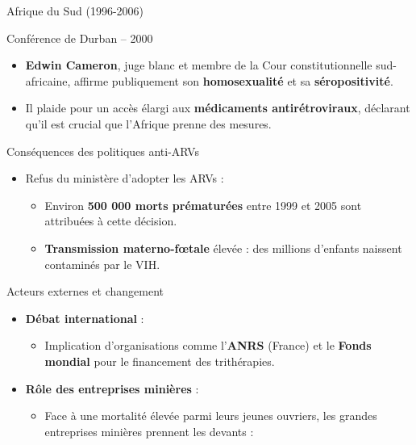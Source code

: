 \documentclass[
  ignorenonframetext,
]{beamer}
\providecommand{\tightlist}{%
  \setlength{\itemsep}{0pt}\setlength{\parskip}{0pt}}\usepackage{longtable,booktabs,array}
\begin{document}
\begin{frame}{Afrique du Sud (1996-2006)}
\begin{block}{Conférence de Durban -- 2000}
\begin{itemize}
  \begin{itemize}
  \tightlist
  \item
    \textbf{Edwin Cameron}, juge blanc et membre de la Cour
    constitutionnelle sud-africaine, affirme publiquement son
    \textbf{homosexualité} et sa \textbf{séropositivité}.
  \item
    Il plaide pour un accès élargi aux \textbf{médicaments
    antirétroviraux}, déclarant qu'il est crucial que l'Afrique prenne
    des mesures.
  \end{itemize}
\end{itemize}
\end{block}

\begin{block}{Conséquences des politiques anti-ARVs}
\protect\hypertarget{consuxe9quences-des-politiques-anti-arvs}{}
\begin{itemize}
\tightlist
\item
  Refus du ministère d'adopter les ARVs :

  \begin{itemize}
  \tightlist
  \item
    Environ \textbf{500 000 morts prématurées} entre 1999 et 2005 sont
    attribuées à cette décision.
  \item
    \textbf{Transmission materno-fœtale} élevée : des millions d'enfants
    naissent contaminés par le VIH.
  \end{itemize}
\end{itemize}
\end{block}

\begin{block}{Acteurs externes et changement}
\protect\hypertarget{acteurs-externes-et-changement}{}
\begin{itemize}
\tightlist
\item
  \textbf{Débat international} :

  \begin{itemize}
  \tightlist
  \item
    Implication d'organisations comme l'\textbf{ANRS} (France) et le
    \textbf{Fonds mondial} pour le financement des trithérapies.
  \end{itemize}
\item
  \textbf{Rôle des entreprises minières} :

  \begin{itemize}
  \tightlist
  \item
    Face à une mortalité élevée parmi leurs jeunes ouvriers, les grandes
    entreprises minières prennent les devants :


\end{itemize}
\end{itemize}
\end{block}
\end{frame}
\end{document}
